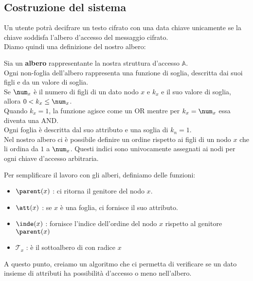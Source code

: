 \subsection{Costruzione del sistema} 

Un utente potrà decifrare un testo cifrato con una data chiave unicamente se la chiave soddisfa l'albero d'accesso del messaggio cifrato.\\[1cm]

Diamo quindi una definizione del nostro albero:\\

\begin{defi}
Sia  un \textbf{albero} rappresentante la nostra struttura d'accesso $\mathbb{A}$.\\
Ogni non-foglia dell'albero rappresenta una funzione di soglia, descritta dai suoi figli e da un valore di soglia.\\
Se $\num_x$ è il numero di figli di un dato nodo $x$ e $k_x$ e il suo valore di soglia, allora $0 < k_x \leq \num_x$.\\
Quando $k_x = 1$, la funzione agisce come un OR mentre per $k_x = \num_x$ essa diventa una AND.\\
Ogni foglia è descritta dal suo attributo e una soglia di $k_n = 1$.\\
Nel nostro albero ci è possibile definire un ordine rispetto ai figli di un nodo $x$ che li ordina da $1$ a $\num_x$. Questi indici sono univocamente assegnati ai nodi per ogni chiave d'accesso arbitraria.
\end{defi}


Per semplificare il lavoro con gli alberi, definiamo delle funzioni:
\begin{itemize}
\item $\parent(x)$ : ci ritorna il genitore del nodo $x$.
\item $\att(x)$ : se $x$ è una foglia, ci fornisce il suo attributo.
\item $\inde(x)$ : fornisce l'indice dell'ordine del nodo $x$ rispetto al genitore $\parent(x)$
\item $\mathcal{T}_x$ : è il sottoalbero di  con radice $x$ 
\end{itemize}

A questo punto, creiamo un algoritmo che ci permetta di verificare se un dato insieme di attributi ha possibilità d'accesso o meno nell'albero.

